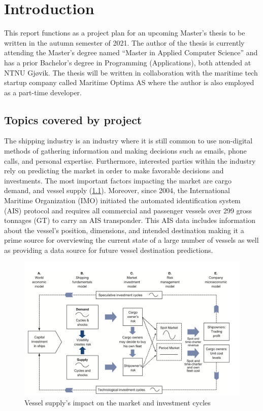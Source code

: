 \chapter{Introduction}

This report functions as a project plan for an upcoming Master’s thesis to be written in the autumn semester of 2021. The author of the thesis is currently attending the Master’s degree named “Master in Applied Computer Science” and has a prior Bachelor’s degree in Programming (Applications), both attended at NTNU Gjøvik. The thesis will be written in collaboration with the maritime tech startup company called Maritime Optima AS where the author is also employed as a part-time developer.

\section{Topics covered by project}

The shipping industry is an industry where it is still common to use non-digital methods of gathering information and making decisions such as emails, phone calls, and personal expertise. Furthermore, interested parties within the industry rely on predicting the market in order to make favorable decisions and investments. The most important factors impacting the market are cargo demand, and vessel supply (\cref{fig:maritime_economics}). Moreover, since 2004, the International Maritime Organization (IMO) initiated the automated identification system (AIS) protocol and requires all commercial and passenger vessels over 299 gross tonnages (GT) to carry an AIS transponder. This AIS data includes information about the vessel’s position, dimensions, and intended destination making it a prime source for overviewing the current state of a large number of vessels as well as providing a data source for future vessel destination predictions.

\begin{figure}[htbp]  %
    \centering
    \includegraphics[width=.89\textwidth]{figures/investment_cycle}
    \caption[Map of NTNU Campuses]{Vessel supply’s impact on the market and investment cycles \parencite{stopford2008}}
    \label{fig:maritime_economics}
\end{figure}

